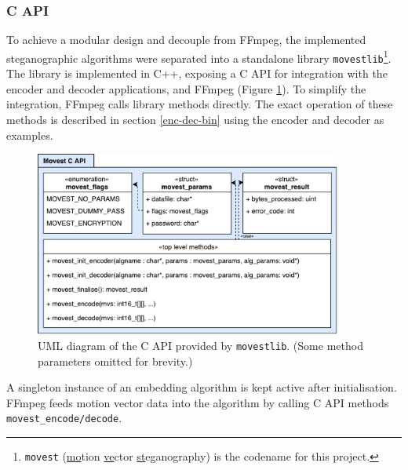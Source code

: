 \documentclass[12pt,british,twoside,notitlepage,usenames,dvipsnames,hypens,final]{report}
\numberwithin{equation}{section}
\numberwithin{figure}{section}
\begin{document}
\subsubsection{C API}

To achieve a modular design and decouple from FFmpeg, the implemented steganographic algorithms were separated into a standalone library \texttt{movestlib}\footnote{\texttt{movest} (\underline{mo}tion \underline{ve}ctor \underline {st}eganography) is the codename for this project.}. The library is implemented in C++, exposing a C API for integration with the encoder and decoder applications, and FFmpeg (Figure \ref{fig:movest-c-api}). To simplify the integration, FFmpeg calls library methods directly. The exact operation of these methods is described in section \ref{enc-dec-bin} using the encoder and decoder as examples.

\begin{figure}[tbh]
\centering
\includegraphics[width=0.9\textwidth]{img/movest_c_api.pdf}
\caption{UML diagram of the C API provided by \texttt{movestlib}. (Some method parameters omitted for brevity.)}
\label{fig:movest-c-api}
\end{figure}

A singleton instance of an embedding algorithm is kept active after initialisation. FFmpeg feeds motion vector data into the algorithm by calling C API methods \texttt{movest\_encode/decode}.  
\end{document}
